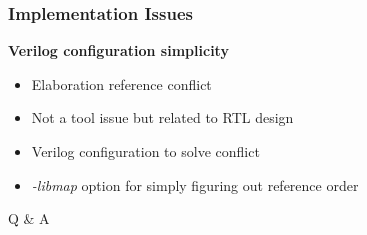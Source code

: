 \documentclass{beamer}
\begin{document}
\begin{frame}
  \frametitle{Implementation Issues}
  \textbf{Verilog configuration simplicity}
  \begin{itemize}
  \item Elaboration reference conflict
  \item Not a tool issue but related to RTL design
  \item Verilog configuration to solve conflict
  \item \textit{-libmap} option for simply figuring out reference order
  \end{itemize}
\end{frame}


\begin{frame}
  \Huge{\centerline{Q \& A}}
\end{frame}

\end{document}
